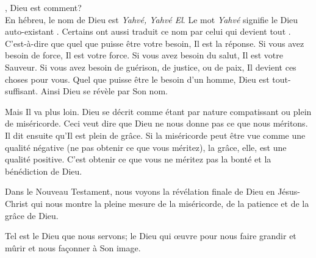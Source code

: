 \dvrule






, Dieu est comment? \\[1ex]
En hébreu, le nom de Dieu est \emph{Yahvé, Yahvé El}.
 Le mot \emph{Yahvé} signifie le \og Dieu auto-existant \fg{}.
 Certains ont aussi traduit ce nom par \og celui qui devient tout \fg{}.
 C'est-à-dire que quel que puisse être votre besoin, Il est la réponse.
 Si vous avez besoin de force, Il est votre force.
 Si vous avez besoin du salut, Il est votre Sauveur.
 Si vous avez besoin de guérison, de justice, ou de paix,
 Il devient ces choses pour vous.
 Quel que puisse être le besoin d'un homme, Dieu est tout-suffisant.
 Ainsi Dieu se révèle par Son nom.

Mais Il va plus loin. Dieu se décrit comme étant par nature compatissant
 ou plein de miséricorde. Ceci veut dire que Dieu ne nous donne pas
 ce que nous méritons.
 Il dit ensuite qu'Il est plein de grâce.
 Si la miséricorde peut être vue comme une qualité négative
 (ne pas obtenir ce que vous méritez), la grâce, elle, est une qualité positive.
 C'est obtenir ce que vous ne méritez pas
 \ocadr{}la bonté et la bénédiction de Dieu.


Dans le Nouveau Testament, nous voyons la révélation finale de Dieu
 en Jésus-Christ qui nous montre la pleine mesure de la miséricorde,
 de la patience et de la grâce de Dieu.

Tel est le Dieu que nous servons; le Dieu qui œuvre pour nous faire grandir
 et mûrir et nous façonner à Son image. 

\dvrule




